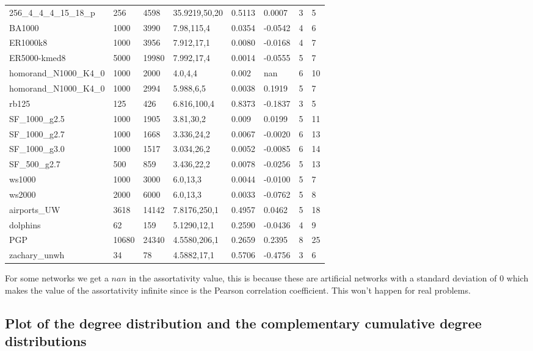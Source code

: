 \documentclass[12pt,a4paper,oneside]{article}
\numberwithin{equation}{section}
\numberwithin{equation}{section}
\theoremstyle{definition}
\begin{document}
\begin{table}[h!]
\begin{tabular}{l|lllllll}
		256\_4\_4\_4\_15\_18\_p &256 &4598 &35.9219,50,20 &0.5113 &0.0007 &3 &5 \\
		BA1000 &1000 &3990 &7.98,115,4 &0.0354 &-0.0542 &4 &6\\ 
		ER1000k8 &1000 &3956 &7.912,17,1 &0.0080&-0.0168 &4 &7 \\ 
		ER5000-kmed8 &5000 &19980 &7.992,17,4 &0.0014 &-0.0555 &5 &7 \\
		homorand\_N1000\_K4\_0 &1000 &2000 &4.0,4,4 &0.002 &nan &6 &10 \\
		homorand\_N1000\_K4\_0 &1000 &2994 &5.988,6,5 &0.0038 &0.1919 &5 &7 \\
		rb125 &125 &426 &6.816,100,4 &0.8373 &-0.1837 &3 &5 \\ 
		SF\_1000\_g2.5 &1000 &1905 &3.81,30,2 &0.009 &0.0199 &5 &11 \\ 
		SF\_1000\_g2.7 &1000 &1668 &3.336,24,2 &0.0067 &-0.0020 &6 &13 \\
		SF\_1000\_g3.0 &1000 &1517 &3.034,26,2 &0.0052 &-0.0085 &6 &14 \\ 
		SF\_500\_g2.7 &500 &859 &3.436,22,2 &0.0078 &-0.0256 &5 &13 \\
		ws1000 &1000 &3000 &6.0,13,3 &0.0044 &-0.0100 &5 &7 \\ 
		ws2000 &2000 &6000 &6.0,13,3 &0.0033 &-0.0762 &5 &8 \\ 
		airports\_UW &3618 &14142 &7.8176,250,1 &0.4957 &0.0462 &5 &18 \\ 
		dolphins &62 &159 &5.1290,12,1 &0.2590 &-0.0436 &4 &9 \\ 
		PGP &10680 &24340 &4.5580,206,1 &0.2659 &0.2395 &8 &25 \\ 
		zachary\_unwh &34 &78 &4.5882,17,1 &0.5706 &-0.4756 &3 &6 \\                             
	\end{tabular}
	
\end{table}

For some networks we get a $nan$ in the assortativity value, this is because these are artificial networks with a standard deviation of $0$ which makes the value of the assortativity infinite since is the Pearson correlation coefficient. This won't happen for real problems.

\subsection{Plot of the degree distribution and the complementary cumulative degree distributions}
\end{document}
